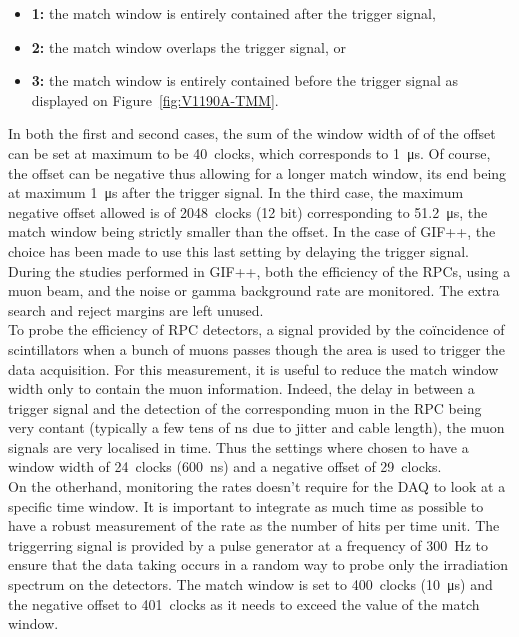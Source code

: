 	\begin{itemize}
		\item \textbf{1:} the match window is entirely contained after the trigger signal,
		\item \textbf{2:} the match window overlaps the trigger signal, or
		\item \textbf{3:} the match window is entirely contained before the trigger signal as displayed on Figure~\ref{fig:V1190A-TMM}.
	\end{itemize}
	
	In both the first and second cases, the sum of the window width of of the offset can be set at maximum to be \SI{40}{clocks}, which corresponds to \SI{1}{\micro s}. Of course, the offset can be negative thus allowing for a longer match window, its end being at maximum \SI{1}{\micro s} after the trigger signal. In the third case, the maximum negative offset allowed is of \SI{2048}{clocks} (12 bit) corresponding to \SI{51.2}{\micro s}, the match window being strictly smaller than the offset. In the case of GIF++, the choice has been made to use this last setting by delaying the trigger signal. During the studies performed in GIF++, both the efficiency of the RPCs, using a muon beam, and the noise or gamma background rate are monitored. The extra search and reject margins are left unused.\\
	To probe the efficiency of RPC detectors, a signal provided by the coïncidence of scintillators when a bunch of muons passes though the area is used to trigger the data acquisition. For this measurement, it is useful to reduce the match window width only to contain the muon information. Indeed, the delay in between a trigger signal and the detection of the corresponding muon in the RPC being very contant (typically a few tens of ns due to jitter and cable length), the muon signals are very localised in time. Thus the settings where chosen to have a window width of \SI{24}{clocks} (\SI{600}{ns}) and a negative offset of \SI{29}{clocks}.\\
	On the otherhand, monitoring the rates doesn't require for the DAQ to look at a specific time window. It is important to integrate as much time as possible to have a robust measurement of the rate as the number of hits per time unit. The triggerring signal is provided by a pulse generator at a frequency of \SI{300}{Hz} to ensure that the data taking occurs in a random way to probe only the irradiation spectrum on the detectors. The match window is set to \SI{400}{clocks} (\SI{10}{\micro s}) and the negative offset to \SI{401}{clocks} as it needs to exceed the value of the match window.\\
	
